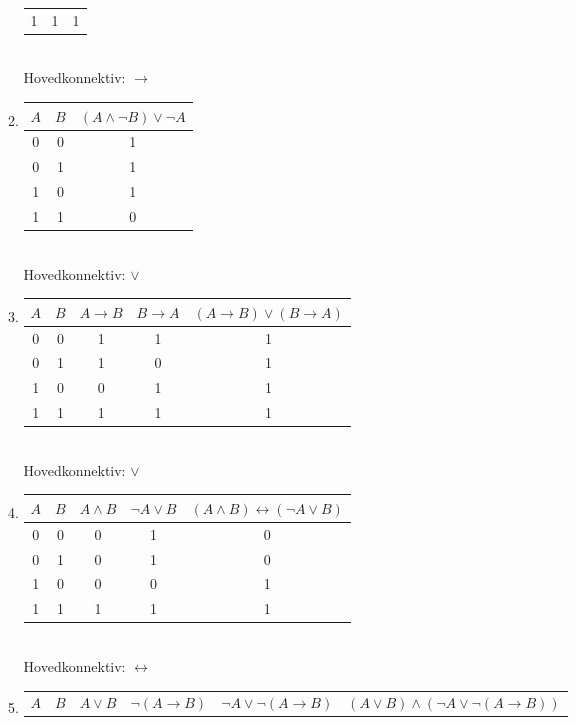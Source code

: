 \documentclass[a4paper, 12pt]{article}  %
\begin{document}
\begin{enumerate}
\begin{enumerate}
\begin{tabular}[t]{c c|c}
            1 & 1 & 1 \\
        \end{tabular}
        \\Hovedkonnektiv: \(\to\)
        \item
        \begin{tabular}[t]{c c|c}
            \(A\) & \(B\) & \((A \land \neg B) \lor \neg A\) \\ 
            \hline
            0 & 0 & 1 \\
            0 & 1 & 1 \\
            1 & 0 & 1 \\
            1 & 1 & 0 \\
        \end{tabular}
        \\Hovedkonnektiv: \(\lor\)
        \item
        \begin{tabular}[t]{c c c c|c}
            \(A\) & \(B\) & \(A \to B\) & \(B \to A\) & \((A \to B) \lor (B \to A)\) \\
            \hline
            0 & 0 & 1 & 1 & 1 \\
            0 & 1 & 1 & 0 & 1 \\
            1 & 0 & 0 & 1 & 1 \\
            1 & 1 & 1 & 1 & 1 \\
        \end{tabular}
        \\Hovedkonnektiv: \(\lor\)
        \item
        \begin{tabular}[t]{c c c c|c}
            \(A\) & \(B\) & \(A \land B\) & \(\neg A \lor B\) & \((A \land B) \leftrightarrow (\neg A \lor B)\) \\
            \hline
            0 & 0 & 0 & 1 & 0 \\
            0 & 1 & 0 & 1 & 0 \\
            1 & 0 & 0 & 0 & 1 \\
            1 & 1 & 1 & 1 & 1 \\
        \end{tabular}
        \\Hovedkonnektiv: \(\leftrightarrow\)
        \item
        \begin{tabular}[t]{c c c c c|c}
            \(A\) & \(B\) & \(A \lor B\) & \(\neg (A \to B)\) & \(\neg A \lor \neg (A \to B)\) & \((A \lor B) \land (\neg A \lor \neg (A \to B))\) \\

\end{tabular}
\end{enumerate}
\end{enumerate}
\end{document}

